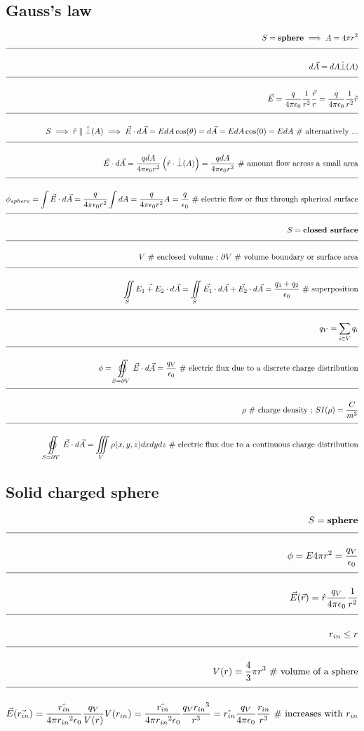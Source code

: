 \documentclass[a4paper]{article}
\newcommand{\eqComment}[1]{\text{  \# #1}}
\newcommand{\eqSep}{\text{ ;  }}
\newcommand{\n}{\\[1.5ex] \hline \nonumber \\[0ex]}
\begin{document}
\subsection{Gauss's law}
\begin{tcolorbox}
\begin{align}
   S = \textbf{sphere} \implies A = 4 \pi r^2
\n d\vec{A} = dA \hat{\perp}(A)
\n \vec{E} = \frac{q}{4 \pi \epsilon_0} \frac{1}{r^2} \frac{\vec{r}}{r} = \frac{q}{4 \pi \epsilon_0} \frac{1}{r^2} \hat{r}
\n S \implies \hat{r} \parallel \hat{\perp}(A) \implies \vec{E} \cdot d\vec{A} = E dA \cos(\theta) = d\vec{A} = E dA \cos(0) = E dA \eqComment{alternatively ...}
\n \vec{E} \cdot d\vec{A} = \frac{q dA}{4 \pi \epsilon_0 r^2} \left(\hat{r} \cdot \hat{\perp}(A)\right) = \frac{q dA}{4 \pi \epsilon_0 r^2} \eqComment{amount flow across a small area}
\n \phi_{sphere} = \int \vec{E} \cdot d\vec{A} = \frac{q}{4 \pi \epsilon_0 r^2} \int dA = \frac{q}{4 \pi \epsilon_0 r^2} A = \frac{q}{\epsilon_0} \eqComment{electric flow or flux through spherical surface}
\n S = \textbf{closed surface}
\n V \eqComment{enclosed volume} \eqSep \partial V \eqComment{volume boundary or surface area}
\n \iint\limits_S \vec{E_1 + E_2} \cdot d\vec{A} = \iint\limits_S \vec{E_1} \cdot d\vec{A} + \vec{E_2} \cdot d\vec{A} = \frac{q_1 + q_2}{\epsilon_0} \eqComment{superposition}
\n q_V = \sum\limits_{i \in V} q_i
\n \phi = \varoiint\limits_{S = \partial V} \vec{E} \cdot d\vec{A} = \frac{q_V}{\epsilon_0}\eqComment{electric flux due to a discrete charge distribution}
\n \rho \eqComment{charge density} \eqSep SI(\rho) = \frac{C}{m^3}
\n \varoiint\limits_{S=\partial V} \vec{E} \cdot d\vec{A} = \iiint\limits_V \rho(x,y,z) dx dy dz \eqComment{electric flux due to a continuous charge distribution}
\end{align}
\end{tcolorbox}

\subsection{Solid charged sphere}
\begin{tcolorbox}
\begin{align}
   S = \textbf{sphere}
\n \phi = E 4 \pi r^2 = \frac{q_V}{\epsilon_0}
\n \vec{E}(\vec{r}) = \hat{r} \frac{q_V}{4 \pi \epsilon_0} \frac{1}{r^2} 
\n r_{in} \leq r
\n V(r) = \frac{4}{3} \pi r^3 \eqComment{volume of a sphere}
\n \vec{E}(\vec{r_{in}}) = \frac{\hat{r_{in}}}{4 \pi {r_{in}}^2 \epsilon_0} \frac{q_V}{V(r)} V(r_{in}) = \frac{\hat{r_{in}}}{4 \pi r{_{in}}^2 \epsilon_0} \frac{q_V {r_{in}}^3}{r^3} = \hat{r_{in}} \frac{q_V}{4 \pi \epsilon_0} \frac{r_{in}}{r^3} \eqComment{increases with $r_{in}$}
\end{align}
\end{tcolorbox}
\end{document}
